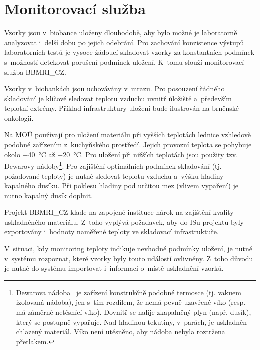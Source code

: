 \documentclass[11pt, final, oneside]{fithesis2}
\newcommand{\ProjectName}{\mbox{BBMRI\_CZ}\xspace}
\begin{document}
\section{Monitorovací služba}\label{chapter:analysis:section:monitoring}
Vzorky jsou v~biobance uloženy dlouhodobě, aby bylo možné je laboratorně analyzovat i~delší dobu po jejich odebrání. Pro zachování konzistence výstupů laboratorních testů je vysoce žádoucí skladovat vzorky za konstantních podmínek s~možností detekovat porušení podmínek uložení. K~tomu slouží monitorovací služba \ProjectName.

Vzorky v~biobankách jsou uchovávány v~mrazu. Pro posouzení řádného skladování je klíčové sledovat teplotu vzduchu uvnitř úložiště a~především teplotní extrémy. Příklad infrastruktury uložení bude ilustrován na brněnské onkologii. 

Na MOÚ používají pro uložení materiálu při vyšších teplotách lednice vzhledově podobné zařízením z~kuchyňského prostředí. Jejich provozní teplota se pohybuje okolo \SI{-40}{\celsius} až \SI{-20}{\celsius}. Pro uložení při nižších teplotách jsou použity tzv. Dewarovy nádoby\footnote{Dewarova nádoba~\cite{dewar} je zařízení konstrukčně podobné termosce (tj. vakuem izolovaná nádoba), jen s~tím rozdílem, že nemá pevně uzavřené víko (resp. má záměrně netěsnící víko). Dovnitř se nalije zkapalněný plyn (např. dusík), který se postupně vypařuje. Nad hladinou tekutiny, v~parách, je uskladněn chlazený materiál. Víko není utěsněno, aby nádoba nebyla roztržena přetlakem.}. Pro zajištění optimálních podmínek skladování (tj. požadované teploty) je nutné sledovat teplotu vzduchu a~výšku hladiny kapalného dusíku. Při poklesu hladiny pod určitou mez (vlivem vypaření) je nutno kapalný dusík doplnit. 

Projekt \ProjectName klade na zapojené instituce nárok na zajištění kvality uskladněného materiálu. Z~toho vyplývá požadavek, aby do ISu projektu byly exportovány i~hodnoty naměřené teploty ve skladovací infrastruktuře.

V~situaci, kdy monitoring teploty indikuje nevhodné podmínky uložení, je nutné v~systému rozpoznat, které vzorky byly touto událostí ovlivněny. Z~toho důvodu je nutné do systému importovat i~informaci o~místě uskladnění vzorků.

\end{document}
